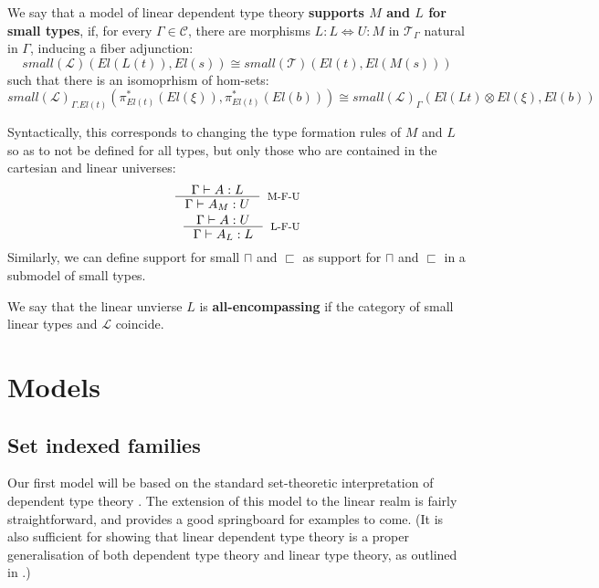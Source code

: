 \begin{defn}
  We say that a model of linear dependent type theory \textbf{supports $M$ and $L$ for small types}, if, for every $\Gamma \in \mathcal{C}$, there are morphisms $L : L \iff U : M$ in $\mathcal{T}_\Gamma$ natural in $\Gamma$, inducing a fiber adjunction:
  \[
    small(\mathcal{L})(El(L(t)), El(s)) \cong small(\mathcal{T})(El(t), El(M(s)))
  \]
  such that there is an isomoprhism of hom-sets:
  \[
    small(\mathcal{L})_{\Gamma.El(t)}(\pi_{El(t)}^*(El(\xi)), \pi_{El(t)}^*(El(b))) \cong small(\mathcal{L})_\Gamma(El(Lt) \otimes El(\xi), El(b))
  \]
\end{defn}
Syntactically, this corresponds to changing the type formation rules of $M$ and $L$ so as to not be defined for all types, but only those who are contained in the cartesian and linear universes:
\[
  \begin{split}
  \inference{\Gamma \vdash A : L}
  {\Gamma \vdash A_M : U}[M-F-U]
  \\
  \inference{\Gamma \vdash A : U}
  {\Gamma \vdash A_L : L}[L-F-U]
  \end{split}
\]
Similarly, we can define support for small $\sqcap$ and $\sqsubset$ as support for $\sqcap$ and $\sqsubset$ in a submodel of small types.
\begin{defn}
  We say that the linear unvierse $L$ is \textbf{all-encompassing} if the category of small linear types and $\mathcal{L}$ coincide.
\end{defn}
\newpage
\section{Models}\label{models}
\subsection{Set indexed families}
Our first model will be based on the standard set-theoretic interpretation of dependent type theory \cite{hofmann1997syntax}. The extension of this model to the linear realm is fairly straightforward, and provides a good springboard for examples to come. (It is also sufficient for showing that linear dependent type theory is a proper generalisation of both dependent type theory and linear type theory, as outlined in \cite{vakar14}.)

